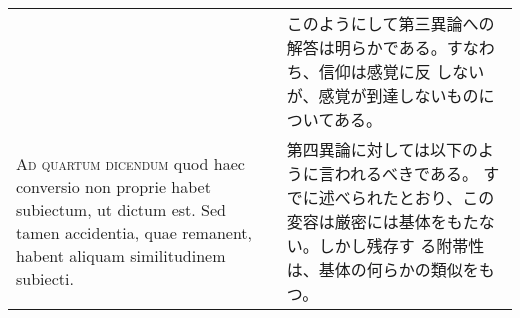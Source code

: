 \documentclass[10pt]{jsarticle} %
\begin{document}
\begin{longtable}{p{21em}p{21em}}
&

このようにして第三異論への解答は明らかである。すなわち、信仰は感覚に反
 しないが、感覚が到達しないものについてある。

\\



{\scshape Ad quartum dicendum} quod haec conversio non proprie habet subiectum,
ut dictum est. Sed tamen accidentia, quae remanent, habent aliquam
similitudinem subiecti.

&

第四異論に対しては以下のように言われるべきである。
すでに述べられたとおり、この変容は厳密には基体をもたない。しかし残存す
 る附帯性は、基体の何らかの類似をもつ。


\end{longtable}
\newpage
\end{document}
